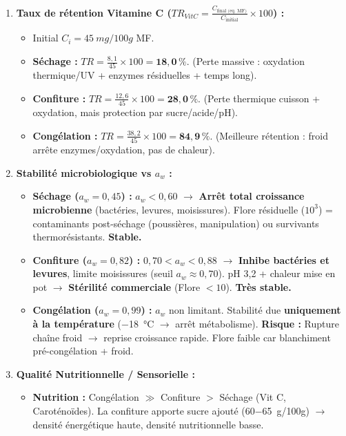 \documentclass[11pt]{article}
\begin{document}
\begin{exoresolu}
\begin{enumerate}
        \item \textbf{Taux de rétention Vitamine C ($TR_{VitC} = \frac{C_{\text{final (eq. MF)}}}{C_{\text{initial}}} \times 100$) :}
            \begin{itemize}
                \item Initial $C_i = \SI{45}{mg/100g}$ MF.
                \item \textbf{Séchage :} $TR = \frac{8,1}{45} \times 100 = \mathbf{18,0\,\%}$. (Perte massive : oxydation thermique/UV + enzymes résiduelles + temps long).
                \item \textbf{Confiture :} $TR = \frac{12,6}{45} \times 100 = \mathbf{28,0\,\%}$. (Perte thermique cuisson + oxydation, mais protection par sucre/acide/pH).
                \item \textbf{Congélation :} $TR = \frac{38,2}{45} \times 100 = \mathbf{84,9\,\%}$. (Meilleure rétention : froid arrête enzymes/oxydation, pas de chaleur).
            \end{itemize}
        \item \textbf{Stabilité microbiologique vs $a_w$ :}
            \begin{itemize}
                \item \textbf{Séchage ($a_w=0,45$) :} $a_w < 0,60$ $\rightarrow$ \textbf{Arrêt total croissance microbienne} (bactéries, levures, moisissures). Flore résiduelle ($10^3$) = contaminants post-séchage (poussières, manipulation) ou survivants thermorésistants. \textbf{Stable.}
                \item \textbf{Confiture ($a_w=0,82$) :} $0,70 < a_w < 0,88$ $\rightarrow$ \textbf{Inhibe bactéries et levures}, limite moisissures (seuil $a_w \approx 0,70$). pH 3,2 + chaleur mise en pot $\rightarrow$ \textbf{Stérilité commerciale} (Flore $<10$). \textbf{Très stable.}
                \item \textbf{Congélation ($a_w=0,99$) :} $a_w$ non limitant. Stabilité due \textbf{uniquement à la température} (\SI{-18}{\celsius} $\rightarrow$ arrêt métabolisme). \textbf{Risque :} Rupture chaîne froid $\rightarrow$ reprise croissance rapide. Flore faible car blanchiment pré-congélation + froid.
            \end{itemize}
        \item \textbf{Qualité Nutritionnelle / Sensorielle :}
            \begin{itemize}
                \item \textbf{Nutrition :} Congélation $\gg$ Confiture $>$ Séchage (Vit C, Caroténoïdes). La confiture apporte sucre ajouté (\SI{60-65}{g/100g}) $\rightarrow$ densité énergétique haute, densité nutritionnelle basse.

\end{itemize}
\end{enumerate}
\end{exoresolu}
\end{document}
